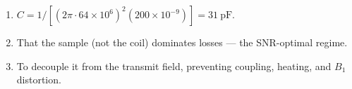 \begin{enumerate}[leftmargin=1.6em,itemsep=2pt]
\item $C = 1/[(2\pi\cdot64\times10^6)^2(200\times10^{-9})] = 31\ \text{pF}$.
\item That the sample (not the coil) dominates losses --- the SNR-optimal regime.
\item To decouple it from the transmit field, preventing coupling, heating, and $B_1$ distortion.
\end{enumerate}
